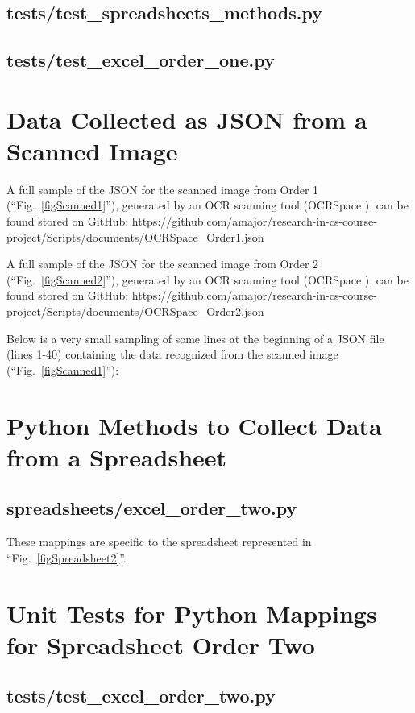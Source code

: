 \documentclass[conference, draftcls]{IEEEtran}
\begin{document}
    \subsection{tests/test\_spreadsheets\_methods.py}
    

    \newpage
    \subsection{tests/test\_excel\_order\_one.py}
    

\newpage
\section{Data Collected as JSON from a Scanned Image} \label{appendixOrderOneJSON}
A full sample of the JSON for the scanned image from Order 1 (``Fig.~\ref{figScanned1}''), generated by an OCR scanning tool (OCRSpace \cite{ocrspace}), can be found stored on GitHub: https://github.com/amajor/research-in-cs-course-project/Scripts/documents/OCRSpace\_Order1.json

A full sample of the JSON for the scanned image from Order 2 (``Fig.~\ref{figScanned2}''), generated by an OCR scanning tool (OCRSpace \cite{ocrspace}), can be found stored on GitHub: https://github.com/amajor/research-in-cs-course-project/Scripts/documents/OCRSpace\_Order2.json

Below is a very small sampling of some lines at the beginning of a JSON file (lines 1-40) containing the data recognized from the scanned image (``Fig.~\ref{figScanned1}''):


% 

\newpage
\section{Python Methods to Collect Data from a Spreadsheet} \label{appendixOrderTwo}
    \subsection{spreadsheets/excel\_order\_two.py}
    These mappings are specific to the spreadsheet represented in ``Fig.~\ref{figSpreadsheet2}''.
    

\newpage
\section{Unit Tests for Python Mappings for Spreadsheet Order Two} \label{appendixOrderTwoTests}
    \subsection{tests/test\_excel\_order\_two.py}
    
\end{document}
